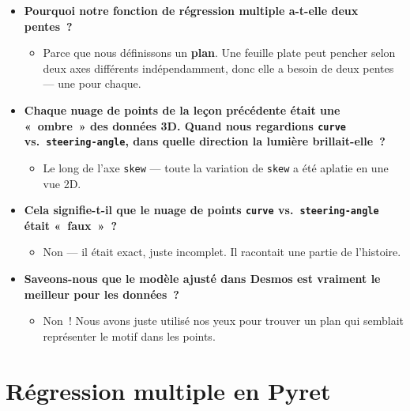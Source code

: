 \documentclass[12pt,a4paper]{article}
\begin{document}
\begin{thinkbox}
  \begin{itemize}
    \item \textbf{Pourquoi notre fonction de régression multiple a-t-elle \textbf{deux} pentes~?}
    \begin{itemize}
      \item Parce que nous définissons un \textbf{plan}. Une feuille plate peut pencher selon deux axes différents indépendamment, donc elle a besoin de deux pentes — une pour chaque.
    \end{itemize}
    \item \textbf{Chaque nuage de points de la leçon précédente était une «~ombre~» des données 3D. Quand nous regardions \texttt{curve} vs.\ \texttt{steering-angle}, dans quelle direction la lumière brillait-elle~?}
    \begin{itemize}
      \item Le long de l'axe \texttt{skew} — toute la variation de \texttt{skew} a été aplatie en une vue 2D.
    \end{itemize}
    \item \textbf{Cela signifie-t-il que le nuage de points \texttt{curve} vs.\ \texttt{steering-angle} était «~faux~»~?}
    \begin{itemize}
      \item Non — il était exact, juste incomplet. Il racontait une partie de l'histoire.
    \end{itemize}
    \item \textbf{Saveons-nous que le modèle ajusté dans Desmos est vraiment le meilleur pour les données~?}
    \begin{itemize}
      \item Non~! Nous avons juste utilisé nos yeux pour trouver un plan qui semblait représenter le motif dans les points.
    \end{itemize}
  \end{itemize}
\end{thinkbox}

\newpage

\section{Régression multiple en Pyret}
\end{document}
